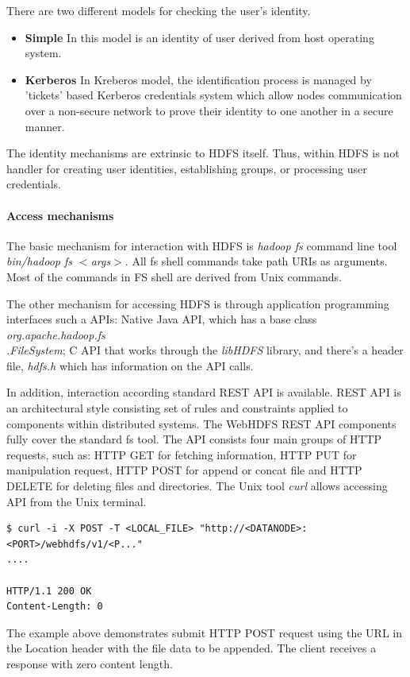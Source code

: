 \documentclass[a4paper,12pt,oneside]{report}
\begin{document}
There are two different models for checking the user's identity.
\begin{itemize}
\item \textbf{Simple}  In this model is an identity of user derived from host operating system.
\item \textbf{Kerberos} In Kreberos model, the identification process is managed by 'tickets' based  Kerberos credentials system which allow nodes communication over a non-secure network to prove their identity to one another in a secure manner.\cite{kerberos}
\end{itemize}

The identity mechanisms are  extrinsic to HDFS itself. Thus, within HDFS is not handler for creating user identities, establishing groups, or processing user credentials.

\paragraph{Access mechanisms}
The basic mechanism for interaction with HDFS is \textit{hadoop fs}  command line tool \textit{bin/hadoop fs $<$args$>$}. 
All fs shell commands take path URIs as arguments. Most of the commands in FS shell are derived from Unix commands. 

The other mechanism for accessing HDFS is through application programming interfaces such a APIs: Native Java API, which has a base class \textit{org.apache.hadoop.fs\\.FileSystem}; C API that works through the \textit{libHDFS} library, and there's a header file, \textit{hdfs.h} which has information on the API calls.

In addition, interaction according standard REST API is available. REST API is an architectural style consisting set of rules and constraints applied to components within distributed systems. The WebHDFS REST API components fully cover the standard fs tool. The API consists four main groups of HTTP requests, such as: HTTP GET for fetching information, HTTP PUT for manipulation request, HTTP POST for append or concat file and HTTP DELETE for deleting files and directories.\cite{rest_api}
The Unix tool \textit{curl}  allows accessing API from the Unix terminal. 
\begin{footnotesize}
\begin{lstlisting}[style=mybash]
$ curl -i -X POST -T <LOCAL_FILE> "http://<DATANODE>:<PORT>/webhdfs/v1/<P..."
....

HTTP/1.1 200 OK
Content-Length: 0
\end{lstlisting}
\end{footnotesize}
The example above demonstrates submit  HTTP POST request using the URL in the Location header with the file data to be appended. The client receives a response with zero content length.
\end{document}
